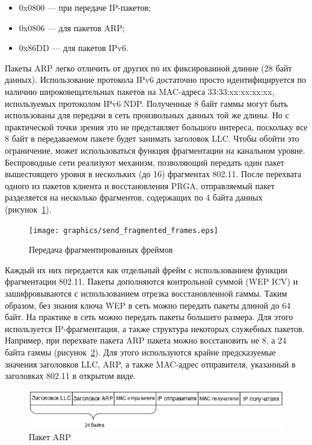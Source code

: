\begin{itemize}
    \item 0x0800 --- при передаче IP-пакетов;
    \item 0x0806 --- для пакетов ARP;
    \item 0x86DD --- для пакетов IPv6.
\end{itemize}

Пакеты ARP легко отличить от других по их фиксированной длинне (28 байт
данных). Использование протокола IPv6 достаточно просто идентифицируется по
наличию широковещательных пакетов на MAC-адреса 33:33:xx:xx:xx:xx, используемых
протоколом IPv6 NDP. Полученные 8 байт гаммы могут быть использованы для
передачи в сеть произвольных данных той же длины. Но с практической точки зрения
это не представляет большого интереса, поскольку все 8 байт в передаваемом
пакете будет занимать заголовок LLC. Чтобы обойти это ограничение, может
использоваться функция фрагментации на канальном уровне. Беспроводные сети
реализуют механизм, позволяющий передать один пакет вышестоящего уровня в
нескольких (до 16) фрагментах 802.11. После перехвата одного из пакетов клиента
и восстановления PRGA, отправляемый пакет разделяется на несколько фрагментов,
содержащих по 4 байта данных (рисунок~\ref{fig:send_fragmented_frames}).

\begin{figure}
    \texttt{[image: graphics/send\_fragmented\_frames.eps]}
    \caption{Передача фрагментированных фреймов}
    \label{fig:send_fragmented_frames}
\end{figure}

Каждый их них передается как отдельный фрейм с использованием функции
фрагментации 802.11. Пакеты дополняются контрольной суммой (WEP ICV) и
зашифровываются с использованием отрезка восстановленной гаммы. Таким образом,
без знания ключа WEP в сеть можно передать пакеты длиной до 64 байт. На практике
в сеть можно передать пакеты большего размера. Для этого используется
IP-фрагментация, а также структура некоторых служебных пакетов. Например, при
перехвате пакета ARP пакета можно восстановить не 8, а 24 байта гаммы
(рисунок~\ref{fig:arp_packet}). Для этого используются крайне предсказуемые
значения заголовков LLC, ARP, а также MAC-адрес отправителя, указанный в
заголовках 802.11 в открытом виде.

\begin{figure}
    \includegraphics[width=1\textwidth]{graphics/arp_packet.eps}
    \caption{Пакет ARP}
    \label{fig:arp_packet}
\end{figure}

